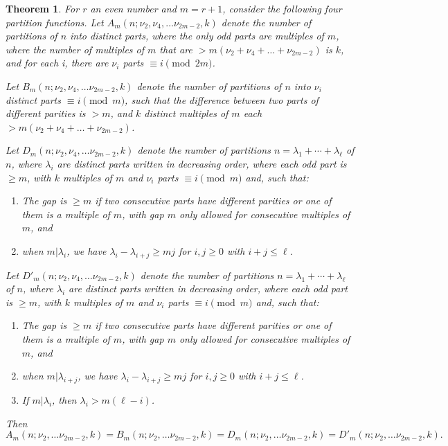 \documentclass[12pt,a4paper]{amsart}
\newtheorem{theorem}{Theorem}
\theoremstyle{definition}
\theoremstyle{notation}
\theoremstyle{corollary}
\begin{document}
\begin{theorem}
For $r$ an even number and $m=r+1$, consider the following four partition functions. Let $A_m(n;\nu_2,\nu_4,\dots\nu_{2m-2},k)$ denote the number of partitions of $n$ into distinct parts, where the only odd parts are multiples of $m$, where the number of multiples of $m$ that are $>m(\nu_2+\nu_4+\dots+\nu_{2m-2})$ is $k$, and for each i, there are $\nu_i$ parts $\equiv i\pmod{2m}$.

Let $B_m(n;\nu_2,\nu_4,\dots\nu_{2m-2},k)$ denote the number of partitions of $n$ into $\nu_{i}$ distinct parts $\equiv i\pmod{m}$, such that the difference between two parts of different parities is $>m$, and $k$ distinct multiples of $m$ each $>m(\nu_2+\nu_4+\dots+\nu_{2m-2})$.

Let $D_m(n;\nu_2,\nu_4,\dots\nu_{2m-2},k)$ denote the number of partitions $ n= \lambda_1 +\cdots +\lambda_{\ell}$ of $n$, where $\lambda_i$ are distinct parts written in decreasing order, where each odd part is $\geq m$, with $k $ multiples of $m$ and $\nu_i$ parts $\equiv i\pmod{m}$ and, such that:\begin{enumerate}[label=(\roman*)]
    \item The gap is $\geq m$ if two consecutive parts have different parities or one of them is a multiple of $m$, with gap $m$ only allowed for consecutive multiples of $m$, and
    \item when $m|\lambda_i$, we have $\lambda_i-\lambda_{i+j}\geq mj$ for $i,j\geq0$ with $i+j\leq \ell$.
\end{enumerate}
\medskip
Let $D'_m(n;\nu_2,\nu_4,\dots\nu_{2m-2},k)$ denote the number of partitions $ n= \lambda_1 +\cdots +\lambda_{\ell}$ of $n$, where $\lambda_i$ are distinct parts written in decreasing order, where each odd part is $\geq m$,  with $k $ multiples of $m$ and $\nu_i$ parts $\equiv i\pmod{m}$ and, such that:\begin{enumerate}[label=(\roman*)]
    \item The gap is $\geq m$ if two consecutive parts have different parities or one of them is a multiple of $m$, with gap $m$ only allowed for consecutive multiples of $m$, and
    \item when $m|\lambda_{i+j}$, we have $\lambda_i-\lambda_{i+j}\geq mj$ for $i,j\geq0$ with $i+j\leq \ell$.
    \item If $m|\lambda_i$, then $\lambda_i>m(\ell-i)$.
\end{enumerate}
\medskip
Then 
\[A_m(n;\nu_2,\dots\nu_{2m-2},k)=B_m(n;\nu_2,\dots\nu_{2m-2},k)=D_m(n;\nu_2,\dots\nu_{2m-2},k)=D'_m(n;\nu_2,\dots\nu_{2m-2},k).\]
\end{theorem}
\end{document}
